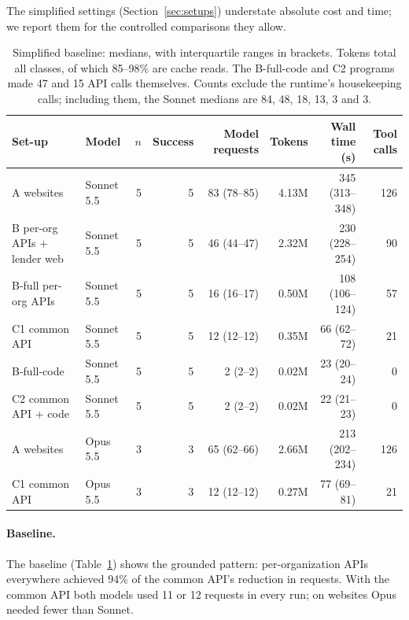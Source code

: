 \documentclass[11pt]{article}
\begin{document}
The simplified settings (Section~\ref{sec:setups}) understate absolute cost and time; we report them for the controlled comparisons they allow.

\begin{table}[t]
\centering
\small
\setlength{\tabcolsep}{3.2pt}
\begin{tabular}{llrrrrrr}
\toprule
Set-up & Model & $n$ & Success & Model requests & Tokens & Wall time (s) & Tool calls \\
\midrule
A websites & Sonnet 5.5 & 5 & 5 & 83 (78--85) & 4.13M & 345 (313--348) & 126 \\
B per-org APIs + lender web & Sonnet 5.5 & 5 & 5 & 46 (44--47) & 2.32M & 230 (228--254) & 90 \\
B-full per-org APIs & Sonnet 5.5 & 5 & 5 & 16 (16--17) & 0.50M & 108 (106--124) & 57 \\
C1 common API & Sonnet 5.5 & 5 & 5 & 12 (12--12) & 0.35M & 66 (62--72) & 21 \\
B-full-code & Sonnet 5.5 & 5 & 5 & 2 (2--2) & 0.02M & 23 (20--24) & 0 \\
C2 common API + code & Sonnet 5.5 & 5 & 5 & 2 (2--2) & 0.02M & 22 (21--23) & 0 \\
\midrule
A websites & Opus 5.5 & 3 & 3 & 65 (62--66) & 2.66M & 213 (202--234) & 126 \\
C1 common API & Opus 5.5 & 3 & 3 & 12 (12--12) & 0.27M & 77 (69--81) & 21 \\
\bottomrule
\end{tabular}
\caption{Simplified baseline: medians, with interquartile ranges in brackets. Tokens total all classes, of which 85--98\% are cache reads. The B-full-code and C2 programs made 47 and 15 API calls themselves. Counts exclude the runtime's housekeeping calls; including them, the Sonnet medians are 84, 48, 18, 13, 3 and 3.}
\label{tab:baseline}
\end{table}

\paragraph{Baseline.} The baseline (Table~\ref{tab:baseline}) shows the grounded pattern: per-organization APIs everywhere achieved 94\% of the common API's reduction in requests. With the common API both models used 11 or 12 requests in every run; on websites Opus needed fewer than Sonnet.
\end{document}
